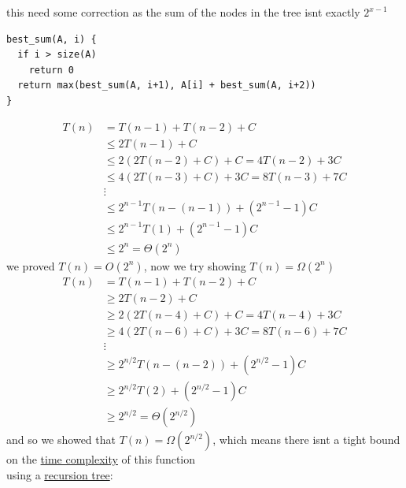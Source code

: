 \documentclass[a4paper,12pt]{article}
\begin{document}
\begin{my_example}
\begin{note}
this need some correction as the sum of the nodes in the tree isnt exactly \(2^{x-1}\)\\
\end{note}
\lstset{language=C,label= ,caption= ,captionpos=b,numbers=none}
\begin{lstlisting}
best_sum(A, i) {
  if i > size(A)
    return 0
  return max(best_sum(A, i+1), A[i] + best_sum(A, i+2))
}
\end{lstlisting}
\begin{align*}
  T(n) &= T(n-1) + T(n-2) + C\\
  &\le 2T(n-1) + C\\
  &\le 2(2T(n-2)+C) + C = 4T(n-2) + 3C\\
  &\le 4(2T(n-3) + C) + 3C = 8T(n-3) + 7C\\
  &\vdots\\
  &\le 2^{n-1}T(n-(n-1)) + \left(2^{n-1}-1\right)C\\
  &\le 2^{n-1}T(1) + \left(2^{n-1}-1\right)C\\
  &\leq 2^n = \Theta(2^n)
\end{align*}
we proved \(T(n) = O(2^n)\), now we try showing \(T(n) = \Omega(2^n)\)\\
\begin{align*}
  T(n) &= T(n-1) + T(n-2) + C\\
  &\ge 2T(n-2) + C\\
  &\ge 2(2T(n-4) + C) + C = 4T(n-4) + 3C\\
  &\ge 4(2T(n-6) + C) + 3C = 8T(n-6) + 7C\\
  &\vdots\\
  &\ge 2^{n/2}T(n-(n-2)) + \left(2^{n/2}-1\right)C\\
  &\ge 2^{n/2}T(2) + \left(2^{n/2}-1\right)C\\
  &\ge 2^{n/2} = \Theta\left(2^{n/2}\right)
\end{align*}
and so we showed that \(T(n) = \Omega\left(2^{n/2}\right)\), which means there isnt a tight bound on the \href{20221130014441-time_complexity.org}{time complexity} of this function\\
using a \hyperref[sec:org555f08a]{recursion tree}:\\
\begin{center}

\end{center}


\end{my_example}
\end{document}
